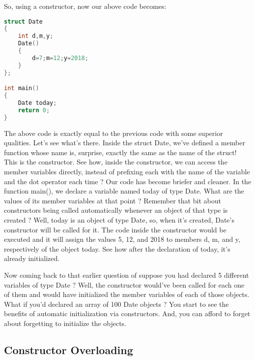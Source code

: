 \documentclass[11pt,fleqn]{book} %
\begin{document}
\noindent So, using a constructor, now our above code becomes:
\begin{lstlisting}[language=C++, caption = Constructor]
struct Date 
{
	int d,m,y;
	Date()
	{
		d=7;m=12;y=2018;
	}
};

int main() 
{
	Date today;
	return 0;
}
\end{lstlisting}

\noindent The above code is exactly equal to the previous code with some superior qualities. Let's see what's there. Inside the struct Date, we've defined a member function whose name is, surprise, exactly the same as the name of the struct! This is the constructor. See how, inside the constructor, we can access the member variables directly, instead of prefixing each with the name of the variable and the dot operator each time ? Our code has become briefer and cleaner. In the function main(), we declare a variable named today of type Date. What are the values of its member variables at that point ? Remember that bit about constructors being called automatically whenever an object of that type is created ? Well, today is an object of type Date, so, when it's created, Date's constructor will be called for it. The code inside the constructor would be executed and it will assign the values 5, 12, and 2018 to members d, m, and y, respectively of the object today. See how after the declaration of today, it's already initialized. 

Now coming back to that earlier question of suppose you had declared 5 different variables of type Date ? Well, the constructor would've been called for each one of them and would have initialized the member variables of each of those objects. What if you'd declared an array of 100 Date objects ? You start to see the benefits of automatic initialization via constructors. And, you can afford to forget about forgetting to initialize the objects.

\subsection{Constructor Overloading}
\end{document}
